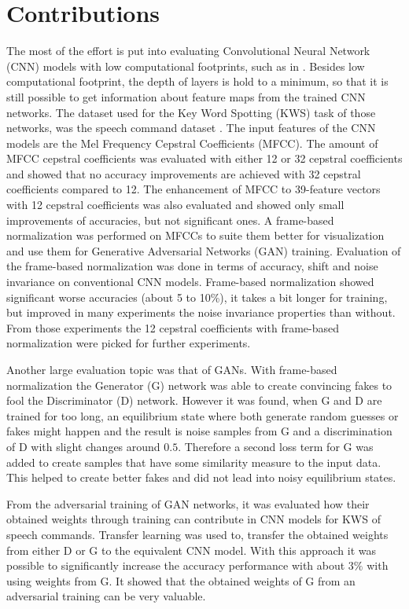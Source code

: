 
\section{Contributions}
The most of the effort is put into evaluating Convolutional Neural Network (CNN) models with low computational footprints, such as in \cite{Sainath2015}.
Besides low computational footprint, the depth of layers is hold to a minimum, so that it is still possible to get information about feature maps from the trained CNN networks.
The dataset used for the Key Word Spotting (KWS) task of those networks, was the speech command dataset \cite{Warden2018}.
The input features of the CNN models are the Mel Frequency Cepstral Coefficients (MFCC).
The amount of MFCC cepstral coefficients was evaluated with either 12 or 32 cepstral coefficients and showed that no accuracy improvements are achieved with 32 cepstral coefficients compared to 12.
The enhancement of MFCC to 39-feature vectors with 12 cepstral coefficients was also evaluated and showed only small improvements of accuracies, but not significant ones.
A frame-based normalization was performed on MFCCs to suite them better for visualization and use them for Generative Adversarial Networks (GAN) training.
Evaluation of the frame-based normalization was done in terms of accuracy, shift and noise invariance on conventional CNN models.
Frame-based normalization showed significant worse accuracies (about 5 to 10\%), it takes a bit longer for training, but improved in many experiments the noise invariance properties than without.
From those experiments the 12 cepstral coefficients with frame-based normalization were picked for further experiments.

Another large evaluation topic was that of GANs. 
With frame-based normalization the Generator (G) network was able to create convincing fakes to fool the Discriminator (D) network.
However it was found, when G and D are trained for too long, an equilibrium state where both generate random guesses or fakes might happen and the result is noise samples from G and a discrimination of D with slight changes around $0.5$.
Therefore a second loss term for G was added to create samples that have some similarity measure to the input data.
This helped to create better fakes and did not lead into noisy equilibrium states.

From the adversarial training of GAN networks, it was evaluated how their obtained weights through training can contribute in CNN models for KWS of speech commands.
Transfer learning was used to, transfer the obtained weights from either D or G to the equivalent CNN model.
With this approach it was possible to significantly increase the accuracy performance with about $3\%$ with using weights from G.
It showed that the obtained weights of G from an adversarial training can be very valuable.

